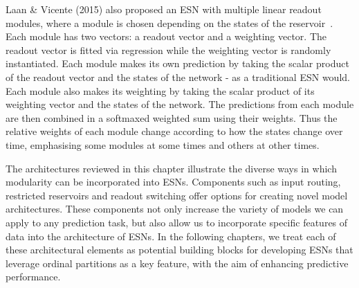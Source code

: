 Laan \& Vicente (2015) also proposed an ESN with multiple linear readout modules, where a module is chosen depending on the states of the reservoir~\cite{laan_vicente_2015}.
Each module has two vectors: a readout vector and a weighting vector.
The readout vector is fitted via regression while the weighting vector is randomly instantiated.
Each module makes its own prediction by taking the scalar product of the readout vector and the states of the network - as a traditional ESN would.
Each module also makes its weighting by taking the scalar product of its weighting vector and the states of the network.
The predictions from each module are then combined in a softmaxed weighted sum using their weights. 
Thus the relative weights of each module change according to how the states change over time, emphasising some modules at some times and others at other times.

\vspace{1em}

The architectures reviewed in this chapter illustrate the diverse ways in which modularity can be incorporated into ESNs. Components such as input routing, restricted reservoirs and readout switching offer options for creating novel model architectures. These components not only increase the variety of models we can apply to any prediction task, but also allow us to incorporate specific features of data into the architecture of ESNs. In the following chapters, we treat each of these architectural elements as potential building blocks for developing ESNs that leverage ordinal partitions as a key feature, with the aim of enhancing predictive performance.


